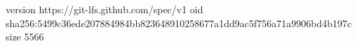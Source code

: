 version https://git-lfs.github.com/spec/v1
oid sha256:5499c36ede207884984bb823648910258677a1dd9ac5f756a71a9906bd4b197c
size 5566
